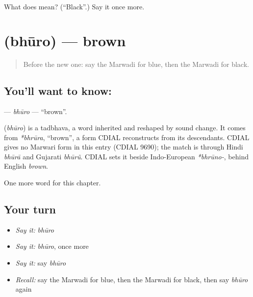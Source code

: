 \begin{tcolorbox}[breakable,colback=teal!4,colframe=teal!35!black,title={Before you move on}]
What does  mean? (\textquotedblleft{}Black\textquotedblright{}.) Say it once more.
\end{tcolorbox}
\section[\texorpdfstring{\mw{भूरो} (bhūro)}{भूरो (bhūro)}]{ (bhūro) — brown}

\label{lesson:MW-C77-bhuro}



\begin{quote}
Before the new one: say the Marwadi for blue, then the Marwadi for black.
\end{quote}

\subsection*{You'll want to know: }
\textbf{} — \emph{bhūro} — \textquotedblleft{}brown\textquotedblright{}.

\begin{cousinweb}
\textbf{} (\emph{bhūro}) is a tadbhava, a word inherited and reshaped by sound change. It comes from \emph{*bhrūra}, \textquotedblleft{}brown\textquotedblright{}, a form CDIAL reconstructs from its descendants. CDIAL gives no Marwari form in this entry (CDIAL 9690); the match is through Hindi \emph{bhūrā} and Gujarati \emph{bhūrũ}. CDIAL sets it beside Indo-European \emph{*bhrūno-}, behind English \emph{brown}.
\end{cousinweb}

\begin{grammarlens}[title={What you've built}]
One more word for this chapter.
\end{grammarlens}

\subsection*{Your turn}
\begin{itemize}
\raggedright
  \item \emph{Say it:} \emph{bhūro}
  \item \emph{Say it:} \emph{bhūro}, once more
  \item \emph{Say it:} say \emph{bhūro}
  \item \emph{Recall:} say the Marwadi for blue, then the Marwadi for black, then say \emph{bhūro} again
\end{itemize}

